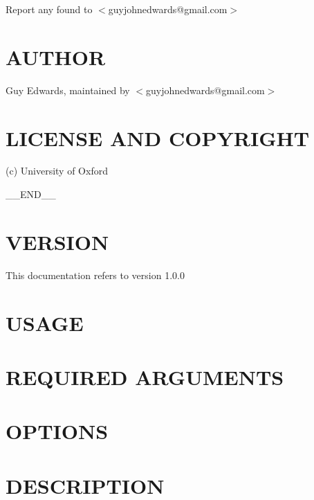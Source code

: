 \documentclass{book}
\begin{document}
Report any found to $<$guyjohnedwards@gmail.com$>$


\section{AUTHOR}
\label{_AUTHOR}
\hypertarget{_AUTHOR}{}



Guy Edwards, maintained by $<$guyjohnedwards@gmail.com$>$


\section{LICENSE AND COPYRIGHT}
\label{_LICENSE_AND_COPYRIGHT}
\hypertarget{_LICENSE_AND_COPYRIGHT}{}



(c) University of Oxford



\_\_END\_\_


\section{VERSION}
\label{_VERSION}
\hypertarget{_VERSION}{}



This documentation refers to version 1.0.0


\section{USAGE}
\label{_USAGE}
\hypertarget{_USAGE}{}


\section{REQUIRED ARGUMENTS}
\label{_REQUIRED_ARGUMENTS}
\hypertarget{_REQUIRED_ARGUMENTS}{}


\section{OPTIONS}
\label{_OPTIONS}
\hypertarget{_OPTIONS}{}


\section{DESCRIPTION}
\label{_DESCRIPTION}
\hypertarget{_DESCRIPTION}{}
\end{document}
